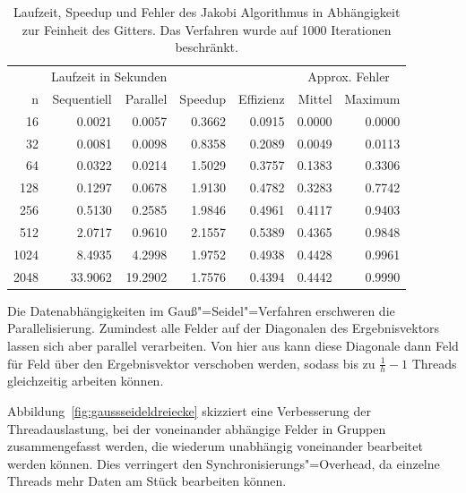 \documentclass[paper = a4]{scrartcl}
\begin{document}
\begin{table}
    \centering
    \begin{tabular}{|r|r|r|r|r|r|r|} \hline
    & \multicolumn{2}{c|}{Laufzeit in Sekunden} & & & \multicolumn{2}{c|}{Approx. Fehler} \\
    n    & Sequentiell & Parallel & Speedup & Effizienz & Mittel & Maximum \\ \hline \hline
    16   & 0.0021      & 0.0057   & 0.3662  & 0.0915    & 0.0000 & 0.0000 \\
    32   & 0.0081      & 0.0098   & 0.8358  & 0.2089    & 0.0049 & 0.0113 \\
    64   & 0.0322      & 0.0214   & 1.5029  & 0.3757    & 0.1383 & 0.3306 \\
    128  & 0.1297      & 0.0678   & 1.9130  & 0.4782    & 0.3283 & 0.7742 \\
    256  & 0.5130      & 0.2585   & 1.9846  & 0.4961    & 0.4117 & 0.9403 \\
    512  & 2.0717      & 0.9610   & 2.1557  & 0.5389    & 0.4365 & 0.9848 \\
    1024 & 8.4935      & 4.2998   & 1.9752  & 0.4938    & 0.4428 & 0.9961 \\
    2048 & 33.9062     & 19.2902  & 1.7576  & 0.4394    & 0.4442 & 0.9990 \\ \hline
    \end{tabular}
    \caption{Laufzeit, Speedup und Fehler des Jakobi Algorithmus in Abhängigkeit zur Feinheit des Gitters. Das Verfahren wurde auf 1000 Iterationen beschränkt.}
    \label{tab:jakobi}
\end{table}

Die Datenabhängigkeiten im Gauß"=Seidel"=Verfahren erschweren die Parallelisierung. Zumindest alle Felder auf der Diagonalen des Ergebnisvektors lassen sich aber parallel verarbeiten. Von hier aus kann diese Diagonale dann Feld für Feld über den Ergebnisvektor verschoben werden, sodass bis zu \(\frac{1}{h} - 1\) Threads gleichzeitig arbeiten können.


Abbildung~\ref{fig:gaussseideldreiecke} skizziert eine Verbesserung der Threadauslastung, bei der voneinander abhängige Felder in Gruppen zusammengefasst werden, die wiederum unabhängig voneinander bearbeitet werden können. Dies verringert den Synchronisierungs"=Overhead, da einzelne Threads mehr Daten am Stück bearbeiten können.
\end{document}

